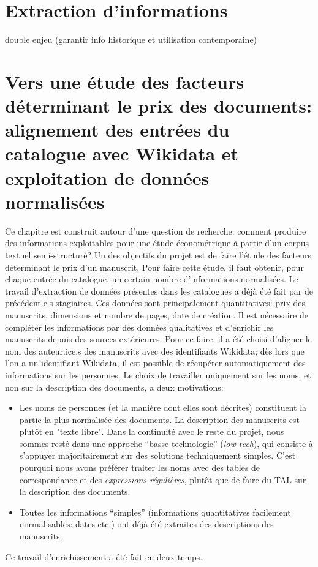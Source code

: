 \documentclass[a4paper, 12pt, twoside]{book}
\newcommand{\rgx}{\textit{expressions régulières}}
\begin{document}
\chapter{Extraction d'informations}
double enjeu (garantir info historique et utilisation contemporaine)


\chapter{Vers une étude des facteurs déterminant le prix des documents: alignement des entrées du catalogue avec Wikidata et exploitation de données normalisées}
Ce chapitre est construit autour d'une question de recherche: comment produire des informations exploitables pour une étude économétrique à partir d'un corpus textuel semi-structuré? Un des objectifs du projet est de faire l'étude des facteurs déterminant le prix d'un manuscrit. Pour faire cette étude, il faut obtenir, pour chaque entrée du catalogue, un certain nombre d'informations normalisées. Le travail d'extraction de données présentes dans les catalogues a déjà été fait par de précédent.e.s stagiaires. Ces données sont principalement quantitatives: prix des manuscrits, dimensions et nombre de pages, date de création. Il est nécessaire de compléter les informations par des données qualitatives et d'enrichir les manuscrits depuis des sources extérieures. Pour ce faire, il a été choisi d'aligner le nom des auteur.ice.s des manuscrits avec des identifiants Wikidata; dès lors que l'on a un identifiant Wikidata, il est possible de récupérer automatiquement des informations sur les personnes. Le choix de travailler uniquement sur les noms, et non sur la description des documents, a deux motivations:
\begin{itemize}
	\item Les noms de personnes (et la manière dont elles sont décrites) constituent la partie la plus normalisée des documents. La description des manuscrits est plutôt en "texte libre". Dans la continuité avec le reste du projet, nous sommes resté dans une approche \enquote{basse technologie} (\textit{low-tech}), qui consiste à s'appuyer majoritairement sur des solutions techniquement simples. C'est pourquoi nous avons préférer traiter les noms avec des tables de correspondance et des \rgx{}, plutôt que de faire du TAL sur la description des documents.
	\item Toutes les informations \enquote{simples} (informations quantitatives facilement normalisables: dates etc.) ont déjà été extraites des descriptions des manuscrits.
\end{itemize}
Ce travail d'enrichissement a été fait en deux temps. 
\end{document}
